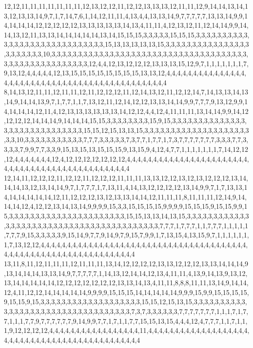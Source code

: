 12,12,11,11,11,11,11,11,11,12,13,12,12,11,12,12,13,13,13,12,11,11,12,9,14,14,13,14,13,12,13,13,14,9,7,1,7,14,7,6,1,14,12,11,11,4,13,4,4,13,13,14,9,7,7,7,7,7,13,13,14,9,9,14,14,14,14,12,12,12,12,12,13,13,13,13,13,14,13,4,11,11,4,12,13,12,11,12,14,14,9,9,14,14,13,12,11,13,13,14,14,14,14,14,13,14,15,15,15,3,3,3,3,3,15,15,15,3,3,3,3,3,3,3,3,3,3,3,3,3,3,3,3,3,3,3,3,3,3,3,3,3,3,3,3,3,15,13,13,13,13,13,15,3,3,3,3,3,3,3,3,3,3,3,3,3,3,3,3,3,3,3,3,3,3,3,10,3,3,3,3,3,3,3,3,3,3,3,3,3,3,3,3,3,3,3,3,3,3,3,3,3,3,3,3,3,3,3,3,3,3,3,3,3,3,3,3,3,3,3,3,3,3,3,3,3,3,3,3,3,12,4,4,12,13,12,12,12,13,13,13,15,12,9,7,1,1,1,1,1,1,1,7,9,13,12,4,4,4,4,4,12,13,15,15,15,15,15,15,15,15,13,13,12,4,4,4,4,4,4,4,4,4,4,4,4,4,4,4,4,4,4,4,4,4,4,4,4,4,4,4,4,4,4,4,4,4,4,4,4,4,4,4,4,4,4,4,4,4,4
8,14,13,12,11,11,12,11,11,12,11,12,12,12,11,12,14,13,12,11,12,12,14,7,14,13,13,14,13,14,9,14,14,13,9,7,1,7,7,1,1,7,13,12,11,12,14,12,12,13,13,14,14,9,9,7,7,7,9,13,12,9,9,14,14,14,14,12,11,4,12,13,13,13,13,13,13,14,12,12,4,4,12,4,11,11,11,13,14,14,9,9,14,12,12,12,12,14,14,14,9,14,14,14,15,15,3,3,3,3,3,3,3,3,15,9,15,3,3,3,3,3,3,3,3,3,3,3,3,3,3,3,3,3,3,3,3,3,3,3,3,3,3,3,3,3,15,15,12,15,13,13,15,3,3,3,3,3,3,3,3,3,3,3,3,3,3,3,3,3,3,3,3,3,3,10,3,3,3,3,3,3,3,3,3,3,3,7,7,7,3,3,3,3,3,7,3,7,7,1,7,7,1,7,3,7,7,7,7,7,7,7,3,3,3,7,7,3,3,3,3,7,9,9,7,7,3,3,9,15,13,15,13,15,15,15,9,13,15,9,4,12,4,7,7,1,1,1,1,1,1,1,7,14,12,12,12,4,4,4,4,4,4,4,12,4,12,12,12,12,12,12,12,4,4,4,4,4,4,4,4,4,4,4,4,4,4,4,4,4,4,4,4,4,4,4,4,4,4,4,4,4,4,4,4,4,4,4,4,4,4,4,4,4,4,4,4,4,4,4
12,14,11,12,12,12,11,12,12,11,12,12,12,11,11,11,13,13,12,12,13,12,13,12,12,12,13,14,14,14,13,12,13,14,14,9,7,1,7,7,7,1,7,13,11,4,14,13,12,12,12,12,13,14,9,9,7,1,7,13,13,14,14,14,14,14,14,12,11,12,12,12,13,12,13,13,14,14,12,11,11,11,8,11,11,11,12,14,9,14,14,14,12,4,12,12,13,14,13,14,9,9,9,9,15,3,3,15,15,15,15,9,9,9,9,15,15,15,9,15,15,9,9,15,3,3,3,3,3,3,3,3,3,3,3,3,3,3,3,3,3,3,3,3,3,3,15,15,13,13,14,13,15,3,3,3,3,3,3,3,3,3,3,3,3,3,3,3,3,3,3,3,3,3,3,3,3,3,3,3,3,3,3,3,3,3,3,3,3,3,3,3,3,3,7,7,7,1,7,7,7,1,1,7,7,7,1,1,1,1,1,7,7,7,9,15,3,3,3,3,3,9,15,14,9,7,7,9,14,9,7,9,15,7,9,9,1,7,13,15,4,13,15,9,7,1,1,1,1,1,1,1,7,13,12,12,4,4,4,4,4,4,4,4,4,4,4,4,4,4,4,4,4,4,4,4,4,4,4,4,4,4,4,4,4,4,4,4,4,4,4,4,4,4,4,4,4,4,4,4,4,4,4,4,4,4,4,4,4,4,4,4,4,4,4,4,4,4,4,4
13,11,8,11,12,11,11,11,12,11,11,11,13,14,12,12,12,12,13,13,12,12,12,13,13,14,14,14,9,13,14,14,14,13,13,14,9,7,7,7,7,7,1,14,13,12,14,14,12,13,4,11,11,4,13,9,14,13,9,13,12,13,14,14,14,14,14,12,12,12,12,12,12,12,13,13,14,13,4,11,11,8,8,8,11,11,13,14,9,14,14,12,4,11,12,12,14,14,14,14,14,9,9,9,9,15,15,15,14,14,14,14,14,9,9,9,15,9,9,15,15,15,15,9,15,15,9,15,3,3,3,3,3,3,3,3,3,3,3,3,3,3,3,3,3,3,3,15,15,12,15,13,15,3,3,3,3,3,3,3,3,3,3,3,3,3,3,3,3,3,3,3,3,3,3,3,3,3,3,3,3,3,3,3,3,3,3,7,3,7,3,3,3,3,3,3,7,7,7,7,7,7,7,1,1,1,7,1,7,7,1,1,1,7,7,9,7,7,7,7,7,7,9,14,9,9,7,7,1,7,1,1,7,7,15,15,13,15,4,4,4,12,4,7,7,7,1,1,7,1,1,1,9,12,12,12,12,4,4,4,4,4,4,4,4,4,4,4,4,4,4,4,4,4,11,4,4,4,4,4,4,4,4,4,4,4,4,4,4,4,4,4,4,4,4,4,4,4,4,4,4,4,4,4,4,4,4,4,4,4,4,4,4,4,4,4,4,4,4,4
